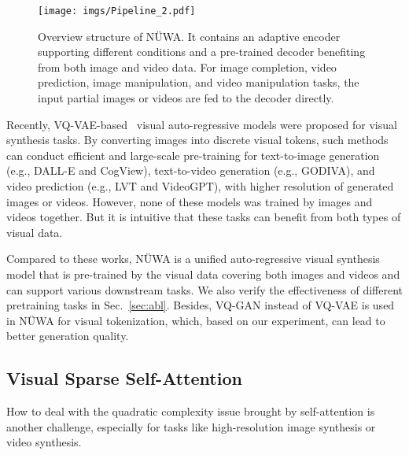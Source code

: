 \documentclass[10pt,twocolumn,letterpaper]{article}
\begin{document}
\begin{figure*}[h]
	\centering
	\texttt{[image: imgs/Pipeline\_2.pdf]}
	\caption{Overview structure of NÜWA. It contains an adaptive encoder supporting different conditions and a pre-trained decoder benefiting from both image and video data. For image completion, video prediction, image manipulation, and video manipulation tasks, the input partial images or videos are fed to the decoder directly.}
	\label{fig:Pipeline}
\end{figure*}
Recently, VQ-VAE-based~\cite{oordNeuralDiscreteRepresentation2017} visual auto-regressive models were proposed for visual synthesis tasks. By converting images into discrete visual tokens, such methods can conduct efficient and large-scale pre-training for text-to-image generation (e.g., DALL-E\cite{rameshZeroShotTexttoImageGeneration2021} and CogView\cite{dingCogViewMasteringTexttoImage2021}), text-to-video generation (e.g., GODIVA\cite{wuGODIVAGeneratingOpenDomaIn2021}), and video prediction (e.g., LVT\cite{rakhimovLatentVideoTransformer2020} and VideoGPT\cite{yanVideoGPTVideoGeneration2021}), with higher resolution of generated images or videos. 
However, none of these models was trained by images and videos together. But it is intuitive that these tasks can benefit from both types of visual data. 

Compared to these works, NÜWA is a unified auto-regressive visual synthesis model that is pre-trained by the visual data covering both images and videos and can support various downstream tasks. We also verify the effectiveness of different pretraining tasks in Sec.~\ref{sec:abl}. Besides, VQ-GAN\cite{esserTamingTransformersHighResolution2021} instead of VQ-VAE is used in NÜWA for visual tokenization, which, based on our experiment, can lead to better generation quality.


\subsection{Visual Sparse Self-Attention}

How to deal with the quadratic complexity issue brought by self-attention is another challenge, especially for tasks like high-resolution image synthesis or video synthesis.
\end{document}
